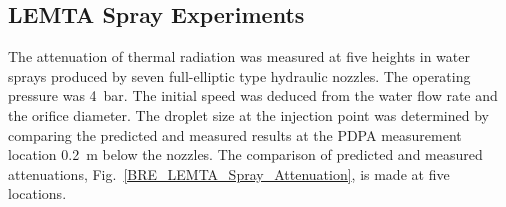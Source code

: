 \subsection{LEMTA Spray Experiments}

The attenuation of thermal radiation was measured at five heights in water sprays produced by seven full-elliptic type hydraulic nozzles. The operating pressure was 4~bar. The initial speed was deduced from the water flow rate and the orifice diameter. The droplet size at the injection point was determined by comparing the predicted and measured results at the PDPA measurement location 0.2~m below the nozzles. The comparison of predicted and measured attenuations, Fig.~\ref{BRE_LEMTA_Spray_Attenuation}, is made at five locations.
